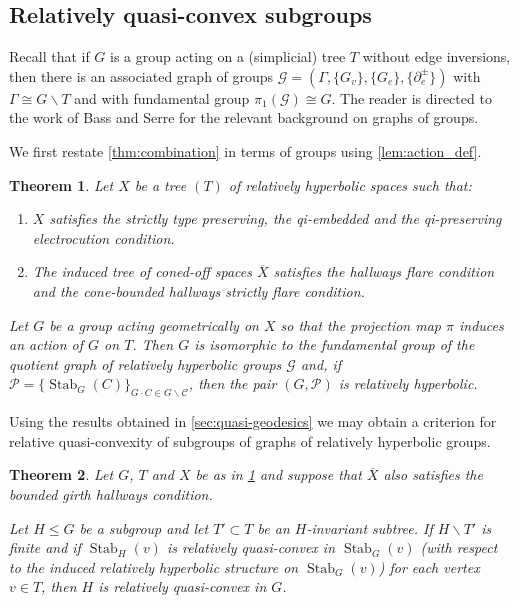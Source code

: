 \documentclass[11pt, a4paper]{amsart}
\newtheorem{theorem}{Theorem}[section]
\theoremstyle{definition}
\newcommand{\isom}{\cong}
\DeclareMathOperator{\stab}{Stab}
\begin{document}
\subsection{Relatively quasi-convex subgroups}


Recall that if $G$ is a group acting on a (simplicial) tree $T$ without edge inversions, then there is an associated graph of groups $\mathcal{G} = (\Gamma, \{G_v\}, \{G_e\}, \{\partial_{e}^\pm\})$ with $\Gamma\cong G\backslash T$ and with fundamental group $\pi_1(\mathcal{G})\isom G$. The reader is directed to the work of Bass \cite{Ba93} and Serre \cite{Se80} for the relevant background on graphs of groups.

We first restate \cref{thm:combination} in terms of groups using \cref{lem:action_def}.

\begin{theorem}
\label{thm:group_combination}
Let $X$ be a tree $(T)$ of relatively hyperbolic spaces such that:
\begin{enumerate}
\item $X$ satisfies the strictly type preserving, the qi-embedded and the qi-preserving electrocution condition.
\item The induced tree of coned-off spaces $\overline{X}$ satisfies the hallways flare condition and the cone-bounded hallways strictly flare condition.
\end{enumerate}
Let $G$ be a group acting geometrically on $X$ so that the projection map $\pi$ induces an action of $G$ on $T$. Then $G$ is isomorphic to the fundamental group of the quotient graph of relatively hyperbolic groups $\mathcal{G}$ and, if $\mathcal{P} = \{\stab_G(C)\}_{G\cdot C\in G\backslash\mathcal{C}}$, then the pair $(G, \mathcal{P})$ is relatively hyperbolic.
\end{theorem}

Using the results obtained in \cref{sec:quasi-geodesics} we may obtain a criterion for relative quasi-convexity of subgroups of graphs of relatively hyperbolic groups.

\begin{theorem}
\label{thm:qc_criterion}
Let $G$, $T$ and $X$ be as in \cref{thm:group_combination} and suppose that $\overline{X}$ also satisfies the bounded girth hallways condition.

Let $H\leqslant G$ be a subgroup and let $T'\subset T$ be an $H$-invariant subtree. If $H\backslash T'$ is finite and if $\stab_H(v)$ is relatively quasi-convex in $\stab_G(v)$ (with respect to the induced relatively hyperbolic structure on $\stab_G(v)$) for each vertex $v\in T$, then $H$ is relatively quasi-convex in $G$.
\end{theorem}
\end{document}
